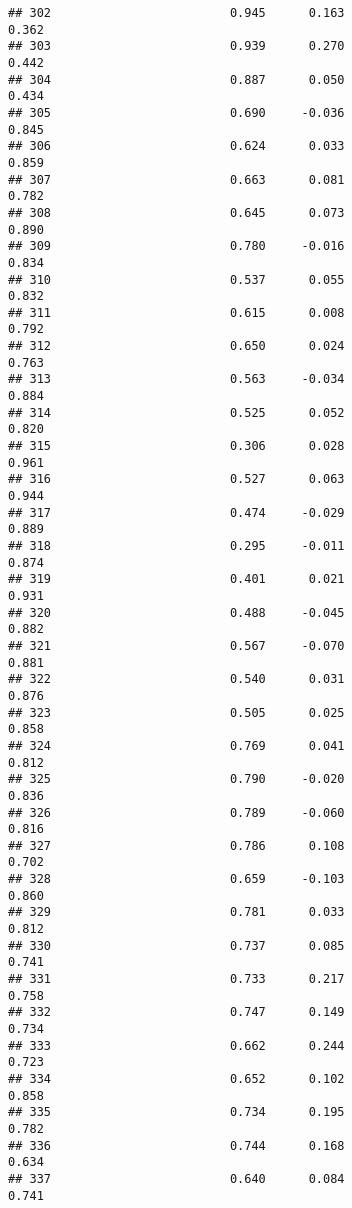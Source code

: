 \documentclass[
]{article}
\begin{document}
\begin{verbatim}
## 302                         0.945      0.163                     0.362
## 303                         0.939      0.270                     0.442
## 304                         0.887      0.050                     0.434
## 305                         0.690     -0.036                     0.845
## 306                         0.624      0.033                     0.859
## 307                         0.663      0.081                     0.782
## 308                         0.645      0.073                     0.890
## 309                         0.780     -0.016                     0.834
## 310                         0.537      0.055                     0.832
## 311                         0.615      0.008                     0.792
## 312                         0.650      0.024                     0.763
## 313                         0.563     -0.034                     0.884
## 314                         0.525      0.052                     0.820
## 315                         0.306      0.028                     0.961
## 316                         0.527      0.063                     0.944
## 317                         0.474     -0.029                     0.889
## 318                         0.295     -0.011                     0.874
## 319                         0.401      0.021                     0.931
## 320                         0.488     -0.045                     0.882
## 321                         0.567     -0.070                     0.881
## 322                         0.540      0.031                     0.876
## 323                         0.505      0.025                     0.858
## 324                         0.769      0.041                     0.812
## 325                         0.790     -0.020                     0.836
## 326                         0.789     -0.060                     0.816
## 327                         0.786      0.108                     0.702
## 328                         0.659     -0.103                     0.860
## 329                         0.781      0.033                     0.812
## 330                         0.737      0.085                     0.741
## 331                         0.733      0.217                     0.758
## 332                         0.747      0.149                     0.734
## 333                         0.662      0.244                     0.723
## 334                         0.652      0.102                     0.858
## 335                         0.734      0.195                     0.782
## 336                         0.744      0.168                     0.634
## 337                         0.640      0.084                     0.741

\end{verbatim}
\end{document}
